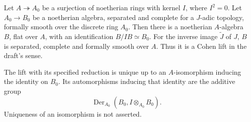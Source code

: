 \begin{theorem}
\label{SA23-A-16}
Let $A\twoheadrightarrow A_0$ be a surjection of noetherian rings
with kernel $I$, where $I^2=0$. Let $A_0\to B_0$ be a noetherian
algebra, separated and complete for a $J$-adic topology, formally
smooth over the discrete ring $A_0$. Then there is a noetherian
$A$-algebra $B$, flat over $A$, with an identification
$B/IB\simeq B_0$. For the inverse image $\widetilde J$ of $J$,
$B$ is separated, complete and formally smooth over $A$.
Thus it is a Cohen lift in the draft's sense.

The lift with its specified reduction is unique up to an
$A$-isomorphism inducing the identity on $B_0$. Its automorphisms
inducing that identity are the additive group
\[
 \operatorname{Der}_{A_0}(B_0,I\otimes_{A_0}B_0).
\]
Uniqueness of an isomorphism is not asserted.
\end{theorem}
